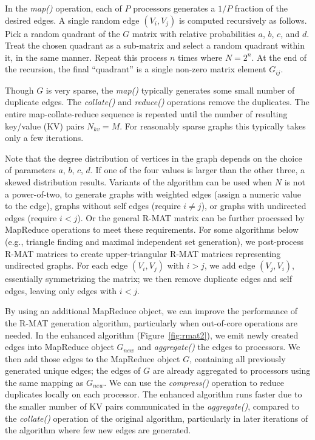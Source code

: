 In the {\it map()} operation, each of $P$ processors generates a $1/P$
fraction of the desired edges.  A single random edge $(V_i,V_j)$ is
computed recursively as follows.  Pick a random quadrant of the $G$
matrix with relative probabilities $a$, $b$, $c$, and $d$.  Treat the
chosen quadrant as a sub-matrix and select a random quadrant within
it, in the same manner.  Repeat this process $n$ times where $N =
2^n$.  At the end of the recursion, the final ``quadrant'' is a single
non-zero matrix element $G_{ij}$.

Though $G$ is very sparse, the {\it map()} typically generates some
small number of duplicate edges.  The {\it collate()} and {\it
reduce()} operations remove the duplicates.  The entire
map-collate-reduce sequence is repeated until the number of resulting
key/value (KV) pairs $N_{kv} = M$.  For reasonably sparse graphs this
typically takes only a few iterations.

Note that the degree distribution of vertices in the graph depends on
the choice of parameters $a$, $b$, $c$, $d$.  If one of the four
values is larger than the other three, a skewed distribution results.
Variants of the algorithm can be used when $N$ is not a power-of-two,
to generate graphs with weighted edges (assign a numeric value to the
edge), graphs without self edges (require $i \ne j$), or graphs with
undirected edges (require $i < j$).  Or the general R-MAT matrix can
be further processed by MapReduce operations to meet these
requirements.  For some algorithms below (e.g., triangle finding and
maximal independent set generation), we post-process R-MAT matrices to
create upper-triangular R-MAT matrices representing undirected graphs.
For each edge $(V_i,V_j)$ with $i > j$, we add edge $(V_j,V_i)$,
essentially symmetrizing the matrix; we then remove duplicate edges
and self edges, leaving only edges with $i < j$.

By using an additional MapReduce object, we can improve the
performance of the R-MAT generation algorithm, particularly when
out-of-core operations are needed.  In the enhanced algorithm
(Figure~\ref{fig:rmat2}), we emit newly created edges into MapReduce
object $G_{new}$ and {\it aggregate()} the edges to processors.  We
then add those edges to the MapReduce object $G$, containing all
previously generated unique edges; the edges of $G$ are already
aggregated to processors using the same mapping as $G_{new}$.  We can
use the {\it compress()} operation to reduce duplicates locally on
each processor.  The enhanced algorithm runs faster due to the smaller
number of KV pairs communicated in the {\it aggregate()}, compared to
the {\it collate()} operation of the original algorithm, particularly
in later iterations of the algorithm where few new edges are
generated.

